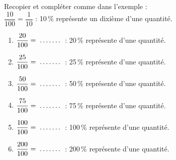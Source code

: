 \begin{exercice*}
    Recopier et compléter comme dans l'exemple : \\ [1mm]
    $\dfrac{10}{100} =\dfrac{1}{10}$ : 10\,\% représente un dixième d'une quantité. \bigskip
    \begin{enumerate}
       \item $\dfrac{20}{100} =\makebox[0.1\linewidth]{\dotfill}$ : 20\,\% représente \makebox[0.1\linewidth]{\dotfill} d'une quantité.\medskip
       \item $\dfrac{25}{100} =\makebox[0.1\linewidth]{\dotfill}$ : 25\,\% représente \makebox[0.1\linewidth]{\dotfill} d'une quantité.\medskip
       \item $\dfrac{50}{100} =\makebox[0.1\linewidth]{\dotfill}$ : 50\,\% représente \makebox[0.1\linewidth]{\dotfill} d'une quantité.\medskip
       \item $\dfrac{75}{100} =\makebox[0.1\linewidth]{\dotfill}$ : 75\,\% représente \makebox[0.1\linewidth]{\dotfill} d'une quantité.\medskip
       \item $\dfrac{100}{100} =\makebox[0.1\linewidth]{\dotfill}$ : 100\,\% représente \makebox[0.1\linewidth]{\dotfill} d'une quantité.\medskip
       \item $\dfrac{200}{100} =\makebox[0.1\linewidth]{\dotfill}$ : 200\,\% représente \makebox[0.1\linewidth]{\dotfill} d'une quantité.
    \end{enumerate}
\end{exercice*}
